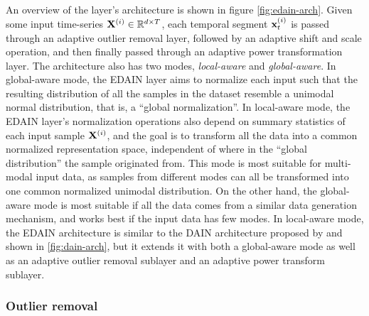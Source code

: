 \documentclass{statsmsc}
\begin{document}
{An overview of the layer's architecture is shown in figure \cref{fig:edain-arch}.
Given some input time-series $\mathbf{X}^{(i)} \in \mathbb{R}^{d \times T}$, each temporal segment
$\mathbf{x}^{(i)}_t$ is passed through an adaptive outlier removal layer, followed by an adaptive shift
and scale operation, and then finally passed through an adaptive power transformation layer.
The architecture also has two modes, \textit{local-aware} and \textit{global-aware}. In
global-aware mode, the \ac{EDAIN} layer aims to normalize each input such that the resulting
distribution of all the samples in the dataset resemble a unimodal normal distribution, that is,
a ``global normalization''. In local-aware mode,
the \ac{EDAIN} layer's normalization operations
also depend on summary statistics of each input sample $\mathbf{X}^{(i)}$, and the goal is to transform
all the data into a common normalized representation space, independent of where in the
``global distribution'' the sample originated from. This mode is most suitable for
multi-modal input data, as samples from different modes can all be transformed into one common
normalized unimodal distribution. On the other hand, the global-aware mode
is most suitable if all the data comes from a similar data generation mechanism,
and works best if the input data has few modes.
In local-aware mode, the \ac{EDAIN} architecture is similar to the
\ac{DAIN} architecture proposed by \citeauthor{dain} and shown
in \cref{fig:dain-arch}, but it
extends it with both a global-aware mode as well as an adaptive outlier removal sublayer and
an adaptive power transform sublayer.

\subsubsection{Outlier removal}%
\label{ssub:Outlier removal}

}
\end{document}
